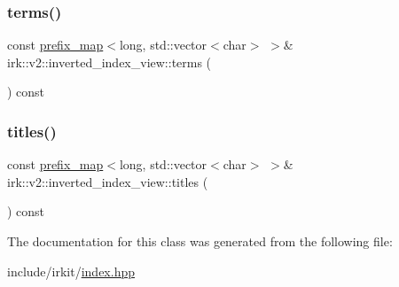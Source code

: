\subsubsection{\texorpdfstring{terms()}{terms()}}
{\footnotesize\ttfamily const \mbox{\hyperlink{classirk_1_1prefix__map}{prefix\+\_\+map}}$<$long, std\+::vector$<$char$>$ $>$\& irk\+::v2\+::inverted\+\_\+index\+\_\+view\+::terms (\begin{DoxyParamCaption}{ }\end{DoxyParamCaption}) const\hspace{0.3cm}{\ttfamily [inline]}}

\mbox{\label{classirk_1_1v2_1_1inverted__index__view_a192e892479d3199aa534ea8e2b4169b0}} 
\subsubsection{\texorpdfstring{titles()}{titles()}}
{\footnotesize\ttfamily const \mbox{\hyperlink{classirk_1_1prefix__map}{prefix\+\_\+map}}$<$long, std\+::vector$<$char$>$ $>$\& irk\+::v2\+::inverted\+\_\+index\+\_\+view\+::titles (\begin{DoxyParamCaption}{ }\end{DoxyParamCaption}) const\hspace{0.3cm}{\ttfamily [inline]}}



The documentation for this class was generated from the following file\+:\begin{DoxyCompactItemize}
\item 
include/irkit/\mbox{\hyperlink{index_8hpp}{index.\+hpp}}\end{DoxyCompactItemize}
